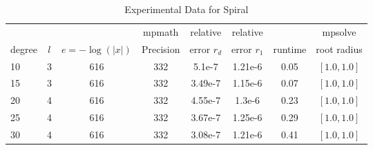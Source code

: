 \documentclass[sigconf]{acmart}
\begin{document}
%

\begin{table}[t]
\caption{Experimental Data for Spiral}
\label{tab:spiral}
\vskip -0.15in
\begin{center}
\begin{small}
\begin{sc}
\begin{tabular}{lccccccc}
\toprule
&  &  & mpmath & relative  & relative &  & mpsolve \\
degree  & $l$& $e=-\log(|x|)$& Precision &error $r_d$       & error $r_1$ &runtime& root radius\\
\midrule
 10 & 3 & 616 & 332 & 5.1e-7 & 1.21e-6 & 0.05 & $[1.0, 1.0]$\\
 15 & 3 & 616 & 332 & 3.49e-7 & 1.15e-6 & 0.07 & $[1.0, 1.0]$\\
 20 & 4 & 616 & 332 & 4.55e-7 & 1.3e-6 & 0.23 & $[1.0, 1.0]$\\
 25 & 4 & 616 & 332 & 3.67e-7 & 1.25e-6 & 0.29 & $[1.0, 1.0]$\\
 30 & 4 & 616 & 332 & 3.08e-7 & 1.21e-6 & 0.41 & $[1.0, 1.0]$\\
\bottomrule
\end{tabular}
\end{sc}
\end{small}
\end{center}
\vskip 0.05in
\end{table}
\end{document}
